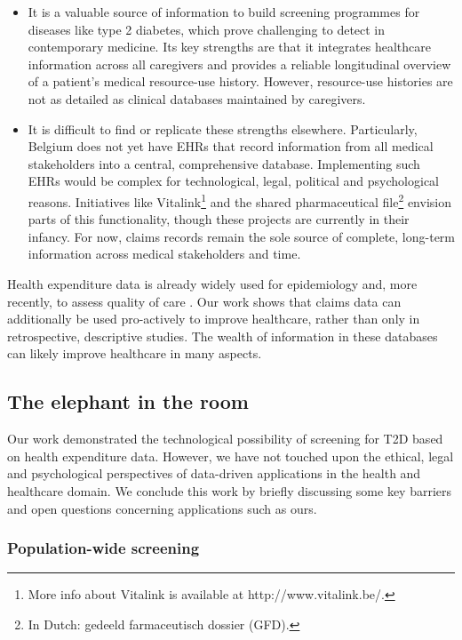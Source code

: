 \begin{itemize}
\item It is a valuable source of information to build screening programmes for diseases like type 2 diabetes, which prove challenging to detect in contemporary medicine. Its key strengths are that it integrates healthcare information across all caregivers and provides a reliable longitudinal overview of a patient's medical resource-use history. However, resource-use histories are not as detailed as clinical databases maintained by caregivers.
\item It is difficult to find or replicate these strengths elsewhere. Particularly, Belgium does not yet have EHRs that record information from all medical stakeholders into a central, comprehensive database. Implementing such EHRs would be complex for technological, legal, political and psychological reasons. Initiatives like Vitalink\footnote{More info about Vitalink is available at http://www.vitalink.be/.} and the shared pharmaceutical file\footnote{In Dutch: gedeeld farmaceutisch dossier (GFD).} envision parts of this functionality, though these projects are currently in their infancy. For now, claims records remain the sole source of complete, long-term information across medical stakeholders and time.
\end{itemize}

Health expenditure data is already widely used for epidemiology \citep{pladevall2004clinical,lee2006medication,garg2010acute,s23} and, more recently, to assess quality of care \citep{kcequality}. Our work shows that claims data can additionally be used pro-actively to improve healthcare, rather than only in retrospective, descriptive studies. The wealth of information in these databases can likely improve healthcare in many aspects.


\subsection{The elephant in the room}
Our work demonstrated the technological possibility of screening for T2D based on health expenditure data. However, we have not touched upon the ethical, legal and psychological perspectives of data-driven applications in the health and healthcare domain. We conclude this work by briefly discussing some key barriers and open questions concerning applications such as ours.

\subsubsection{Population-wide screening}

